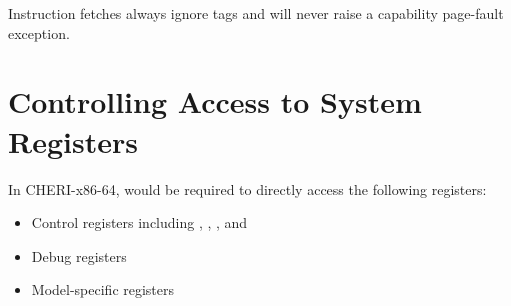 Instruction fetches always ignore tags and will never raise a
capability page-fault exception.

\section{Controlling Access to System Registers}

In CHERI-x86-64, \cappermASR{} would be required to directly access the
following registers:

\begin{itemize}
  \item Control registers including \KCC{}, \KSC{}, \CSTAR{}, and \KGS{}
  \item Debug registers
  \item Model-specific registers
\end{itemize}
